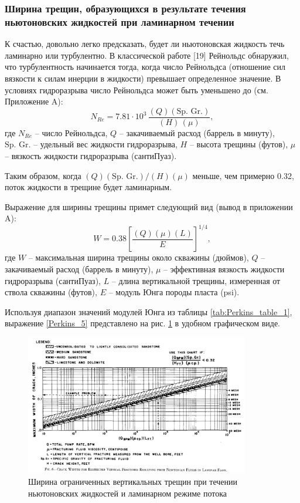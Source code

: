 \documentclass[a4paper, 12pt]{article}
\newcommand{\beq}{\begin{equation}}
\newcommand{\eeq}{\end{equation}}
\begin{document}
\subsubsection{Ширина трещин, образующихся в результате течения ньютоновских жидкостей при ламинарном течении}

К счастью, довольно легко предсказать, будет ли ньютоновская жидкость течь ламинарно или турбулентно.
В классической работе [19] Рейнольдс обнаружил, что турбулентность начинается тогда, когда число Рейнольдса (отношение сил вязкости к силам инерции в жидкости) превышает определенное значение.
В условиях гидроразрыва число Рейнольдса может быть уменьшено до (см. Приложение A):
$$
N_{Re}=7.81\cdot 10^3\,\frac{(Q)(\text{Sp. Gr.})}{(H)\,(\mu)},
$$
где
$N_{Re}$ -- число Рейнольдса,\newline
$Q$ -- закачиваемый расход (баррель в минуту),\newline
$\text{Sp. Gr.}$ -- удельный вес жидкости гидроразрыва,\newline
$H$ -- высота трещины (футов),\newline
$\mu$ -- вязкость жидкости гидроразрыва (сантиПуаз).

Таким образом, когда $(Q)(\text{Sp. Gr.})/(H)(\mu)$ меньше, чем примерно 0.32, поток жидкости в трещине будет ламинарным.

Выражение для ширины трещины примет следующий вид (вывод в приложении A):
\beq\label{Perkins_5}
W=0.38\left[\frac{(Q)(\mu)(L)}{E}\right]^{1/4},
\tag{5}
\eeq
где
$W$ -- максимальная ширина трещины около скважины (дюймов),\newline
$Q$ -- закачиваемый расход (баррель в минуту),\newline
$\mu$ -- эффективная вязкость жидкости гидроразрыва (сантиПуаз),\newline
$L$ -- длина вертикальной трещины, измеренная от ствола скважины (футов),\newline
$E$ -- модуль Юнга породы пласта (psi).

Используя диапазон значений модулей Юнга из таблицы \ref{tab:Perkins_table_1}, выражение \eqref{Perkins_5} представлено на рис. \ref{fig:Perkins6} в удобном графическом виде.

\begin{figure}[H]
\center
\includegraphics[width=0.87\textwidth]{Perkins_6}
\caption{Ширина ограниченных вертикальных трещин при течении ньютоновских жидкостей и ламинарном режиме потока}
\label{fig:Perkins6}
\end{figure}
\end{document}
